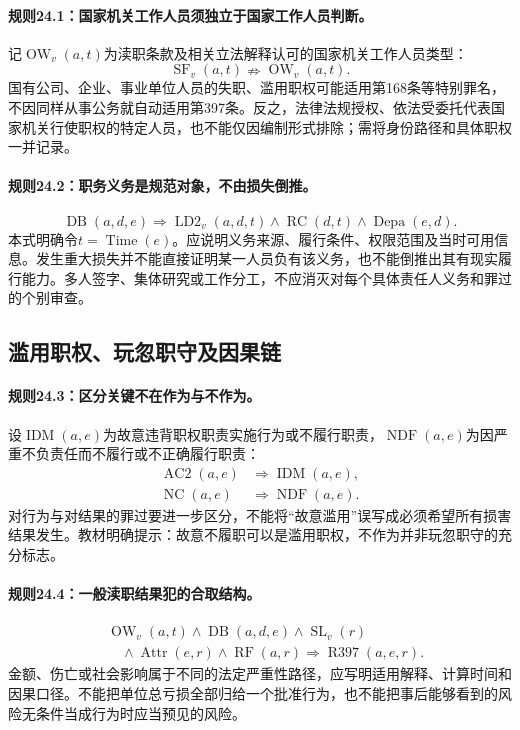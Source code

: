 \paragraph{规则24.1：国家机关工作人员须独立于国家工作人员判断。}
记$\operatorname{OW}_v(a,t)$为渎职条款及相关立法解释认可的国家机关工作人员类型：
\[
\operatorname{SF}_v(a,t)
\nRightarrow\operatorname{OW}_v(a,t).
\]
国有公司、企业、事业单位人员的失职、滥用职权可能适用第168条等特别罪名，不因同样从事公务就自动适用第397条。反之，法律法规授权、依法受委托代表国家机关行使职权的特定人员，也不能仅因编制形式排除；需将身份路径和具体职权一并记录。

\paragraph{规则24.2：职务义务是规范对象，不由损失倒推。}
\[
\operatorname{DB}(a,d,e)
\Rightarrow\operatorname{LD2}_v(a,d,t)
\land\operatorname{RC}(d,t)\land\operatorname{Depa}(e,d).
\]
本式明确令$t=\operatorname{Time}(e)$。应说明义务来源、履行条件、权限范围及当时可用信息。发生重大损失并不能直接证明某一人员负有该义务，也不能倒推出其有现实履行能力。多人签字、集体研究或工作分工，不应消灭对每个具体责任人义务和罪过的个别审查。

\subsection{滥用职权、玩忽职守及因果链}
\paragraph{规则24.3：区分关键不在作为与不作为。}
设$\operatorname{IDM}(a,e)$为故意违背职权职责实施行为或不履行职责，$\operatorname{NDF}(a,e)$为因严重不负责任而不履行或不正确履行职责：
\[
\begin{aligned}
\operatorname{AC2}(a,e)&\Rightarrow
\operatorname{IDM}(a,e),\\
\operatorname{NC}(a,e)&\Rightarrow
\operatorname{NDF}(a,e).
\end{aligned}
\]
对行为与对结果的罪过要进一步区分，不能将“故意滥用”误写成必须希望所有损害结果发生。教材明确提示：故意不履职可以是滥用职权，不作为并非玩忽职守的充分标志。

\paragraph{规则24.4：一般渎职结果犯的合取结构。}
\[
\begin{aligned}
&\operatorname{OW}_v(a,t)\land\operatorname{DB}(a,d,e)
\land\operatorname{SL}_v(r)\\
&\quad\land\operatorname{Attr}(e,r)\land\operatorname{RF}(a,r)
\Rightarrow\operatorname{R397}(a,e,r).
\end{aligned}
\]
金额、伤亡或社会影响属于不同的法定严重性路径，应写明适用解释、计算时间和因果口径。不能把单位总亏损全部归给一个批准行为，也不能把事后能够看到的风险无条件当成行为时应当预见的风险。


